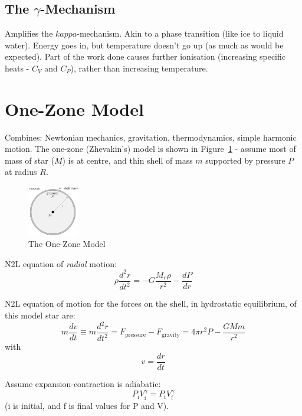 \documentclass{spy}
\begin{document}
\subsection{The \(\gamma\)-Mechanism}
Amplifies the \(kappa\)-mechanism. Akin to a phase transition (like ice to liquid water). Energy goes in, but temperature doesn't go up (as much as would be expected). Part of the work done causes further ionisation (increasing specific heats - \(C_V\) and \(C_P\)), rather than increasing temperature.

\section{One-Zone Model}
Combines: Newtonian mechanics, gravitation, thermodynamics, simple harmonic motion.
The one-zone (Zhevakin's) model is shown in Figure~\ref{one_zone_model_diagram} - assume most of mass of star (\(M\)) is at centre, and thin shell of mass \(m\) supported by pressure \(P\) at radius \(R\). 



\begin{figure}[h]
    \centering
    \includegraphics[width=0.2\textwidth]{one_zone_model.eps}
    \caption{The One-Zone Model} 
    \label{one_zone_model_diagram}
\end{figure}

N2L equation of \textit{radial} motion:
\begin{equation}
    \rho \frac{d^2r}{dt^2} = -G \frac{M_r \rho}{r^2} - \frac{dP}{dr}
\end{equation}

N2L equation of motion for the forces on the shell, in hydrostatic equilibrium, of this model star are:
\begin{equation}
    m\frac{dv}{dt} \equiv m\frac{d^2r}{dt^2}= F_\mathrm{pressure} - F_\mathrm{gravity} 
    = 4 \pi r^2 P - \frac{GMm}{r^2}
    \label{N2L_sphere}
\end{equation}
with
\begin{equation}
    v = \frac{dr}{dt}
    \label{vdrdt}
\end{equation}

Assume expansion-contraction is adiabatic:
\begin{equation}
    P_\mathrm{i} V_\mathrm{i}^\gamma = P_\mathrm{f} V_\mathrm{f}^\gamma
    \label{adiabatic}
\end{equation}
(i is initial, and f is final values for P and V).
\end{document}
